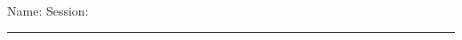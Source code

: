 \documentclass[a4paper,addpoints,12pt]{exam}
\begin{document}
\vspace{2em}Name: \hrulefill \;\; Session: \rule{1in}{0.5pt}
\vspace{2em}


\end{document}
